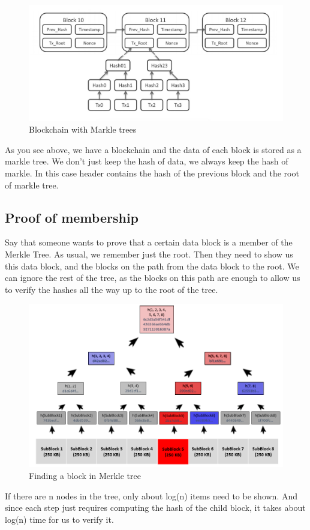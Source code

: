 \begin{figure}[h!]
    \centering
    \includegraphics[width=0.65\linewidth]{Fig/02/F4}
    \caption{Blockchain with Markle trees}
    \label{fig:f4}
\end{figure}

As you see above, we have a blockchain and the data of each block is stored as a markle tree. We don't just keep the hash of data, we always keep the hash of markle. In this case header contains the hash of the previous block and the root of markle tree.

\subsection*{Proof of membership}
Say that someone wants to prove that a certain data block is a member of the Merkle Tree. As usual, we remember just the root. Then they need to show us this data block, and the blocks on the path from the data block to the root. We can ignore the rest of the tree, as the blocks on this path are enough to allow us to verify the hashes all the way up to the root of the tree.
\begin{center}
    \begin{figure}[h!]
        \centering
        \includegraphics[width=0.7\linewidth]{Fig/02/F3}
        \caption{Finding a block in Merkle tree}
        \label{fig:f3}
    \end{figure}
\end{center}
If there are n nodes in the tree, only about log(n) items need to be shown. And since each step just requires computing the hash of the child block, it takes about log(n) time for us to verify it.
